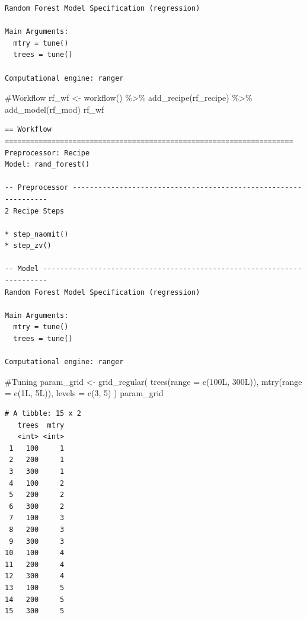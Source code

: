 \documentclass[
]{article}
\newenvironment{Shaded}{\begin{snugshade}}{\end{snugshade}}
\newcommand{\AttributeTok}[1]{\textcolor[rgb]{0.40,0.45,0.13}{#1}}
\newcommand{\CommentTok}[1]{\textcolor[rgb]{0.37,0.37,0.37}{#1}}
\newcommand{\DecValTok}[1]{\textcolor[rgb]{0.68,0.00,0.00}{#1}}
\newcommand{\FunctionTok}[1]{\textcolor[rgb]{0.28,0.35,0.67}{#1}}
\newcommand{\NormalTok}[1]{\textcolor[rgb]{0.00,0.23,0.31}{#1}}
\newcommand{\OtherTok}[1]{\textcolor[rgb]{0.00,0.23,0.31}{#1}}
\newcommand{\SpecialCharTok}[1]{\textcolor[rgb]{0.37,0.37,0.37}{#1}}
\begin{document}
\begin{verbatim}
Random Forest Model Specification (regression)

Main Arguments:
  mtry = tune()
  trees = tune()

Computational engine: ranger 
\end{verbatim}

\begin{Shaded}
\begin{Highlighting}[]
\CommentTok{\#Workflow}
\NormalTok{rf\_wf }\OtherTok{\textless{}{-}} \FunctionTok{workflow}\NormalTok{() }\SpecialCharTok{\%\textgreater{}\%}
  \FunctionTok{add\_recipe}\NormalTok{(rf\_recipe) }\SpecialCharTok{\%\textgreater{}\%}
  \FunctionTok{add\_model}\NormalTok{(rf\_mod)}
\NormalTok{rf\_wf}
\end{Highlighting}
\end{Shaded}

\begin{verbatim}
== Workflow ====================================================================
Preprocessor: Recipe
Model: rand_forest()

-- Preprocessor ----------------------------------------------------------------
2 Recipe Steps

* step_naomit()
* step_zv()

-- Model -----------------------------------------------------------------------
Random Forest Model Specification (regression)

Main Arguments:
  mtry = tune()
  trees = tune()

Computational engine: ranger 
\end{verbatim}

\begin{Shaded}
\begin{Highlighting}[]
\CommentTok{\#Tuning}
\NormalTok{param\_grid }\OtherTok{\textless{}{-}} \FunctionTok{grid\_regular}\NormalTok{(}
  \FunctionTok{trees}\NormalTok{(}\AttributeTok{range =} \FunctionTok{c}\NormalTok{(100L, 300L)), }
  \FunctionTok{mtry}\NormalTok{(}\AttributeTok{range =} \FunctionTok{c}\NormalTok{(1L, 5L)),}
  \AttributeTok{levels =} \FunctionTok{c}\NormalTok{(}\DecValTok{3}\NormalTok{, }\DecValTok{5}\NormalTok{)}
\NormalTok{  )}
\NormalTok{param\_grid}
\end{Highlighting}
\end{Shaded}

\begin{verbatim}
# A tibble: 15 x 2
   trees  mtry
   <int> <int>
 1   100     1
 2   200     1
 3   300     1
 4   100     2
 5   200     2
 6   300     2
 7   100     3
 8   200     3
 9   300     3
10   100     4
11   200     4
12   300     4
13   100     5
14   200     5
15   300     5
\end{verbatim}
\end{document}
